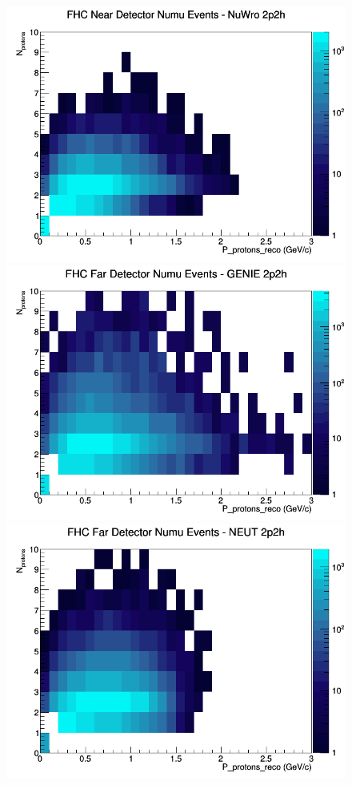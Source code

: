 \documentclass[12pt]{article}
\begin{document}
\begin{figure}[h]
\includegraphics[width=\linewidth]{eff_N_P/GAr/protons/2p2h_FHC_ND_numu_N_P_NuWro.png}
\endminipage
\newline
{}
\includegraphics[width=\linewidth]{eff_N_P/GAr/protons/2p2h_FHC_FD_numu_N_P_GENIE.png}
\endminipage
{}
\includegraphics[width=\linewidth]{eff_N_P/GAr/protons/2p2h_FHC_FD_numu_N_P_NEUT.png}

\end{figure}
\end{document}
